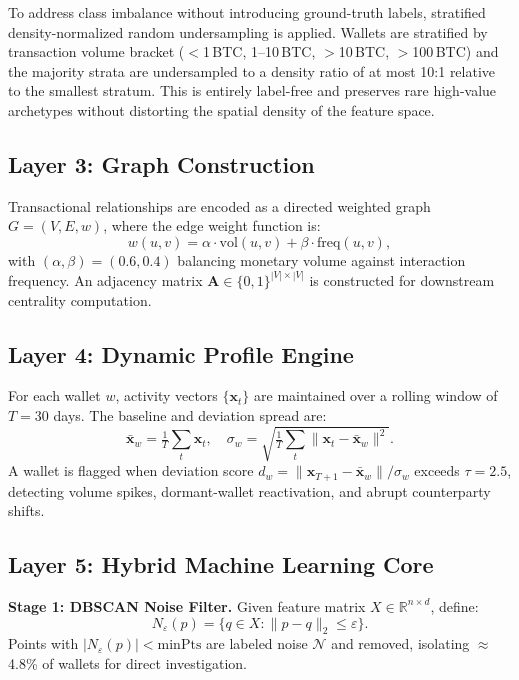 \documentclass[conference]{IEEEtran}
\begin{document}
To address class imbalance without introducing ground-truth labels,
stratified density-normalized random undersampling is applied.
Wallets are stratified by transaction volume bracket
($<$1\,BTC, 1--10\,BTC, $>$10\,BTC, $>$100\,BTC) and the
majority strata are undersampled to a density ratio of at most
10:1 relative to the smallest stratum. This is entirely
label-free and preserves rare high-value archetypes without
distorting the spatial density of the feature space.

\subsection{Layer 3: Graph Construction}
Transactional relationships are encoded as a directed weighted
graph $G=(V,E,w)$, where the edge weight function is:
\begin{equation}
  w(u,v) = \alpha \cdot \mathrm{vol}(u,v) +
            \beta \cdot \mathrm{freq}(u,v),
  \label{eq:weight}
\end{equation}
with $(\alpha,\beta)\!=\!(0.6,0.4)$ balancing monetary volume
against interaction frequency. An adjacency matrix
$\mathbf{A} \in \{0,1\}^{|V|\times|V|}$ is constructed for
downstream centrality computation.

\subsection{Layer 4: Dynamic Profile Engine}
For each wallet $w$, activity vectors $\{\mathbf{x}_t\}$ are
maintained over a rolling window of $T\!=\!30$ days. The
baseline and deviation spread are:
\begin{equation}
  \bar{\mathbf{x}}_w = \tfrac{1}{T}\textstyle\sum_{t}\mathbf{x}_t,
  \quad
  \sigma_w = \sqrt{\tfrac{1}{T}\textstyle\sum_{t}
  \|\mathbf{x}_t - \bar{\mathbf{x}}_w\|^2}.
\end{equation}
A wallet is flagged when deviation score
$d_w = \|\mathbf{x}_{T+1} - \bar{\mathbf{x}}_w\| / \sigma_w$
exceeds $\tau\!=\!2.5$, detecting volume spikes, dormant-wallet
reactivation, and abrupt counterparty shifts.

\subsection{Layer 5: Hybrid Machine Learning Core}
\textbf{Stage 1: DBSCAN Noise Filter.}
Given feature matrix $X \in \mathbb{R}^{n \times d}$, define:
\begin{equation}
  N_\varepsilon(p) = \{q \in X : \|p - q\|_2 \leq \varepsilon\}.
\end{equation}
Points with $|N_\varepsilon(p)| < \mathrm{minPts}$ are labeled
noise $\mathcal{N}$ and removed, isolating $\approx$4.8\% of
wallets for direct investigation.
\end{document}
